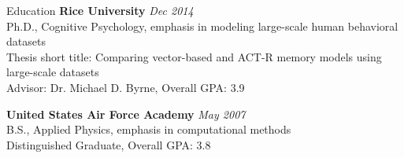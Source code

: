  
\begin{rSection}{Education}
  {\bf Rice University} \hfill {\em Dec 2014} \\
  Ph.D., Cognitive Psychology, emphasis in modeling large-scale human behavioral datasets \\
  Thesis short title: Comparing vector-based and ACT-R memory models using large-scale datasets \\
  Advisor: Dr. Michael D. Byrne, Overall GPA: 3.9
\item {\bf United States Air Force Academy} \hfill {\em May 2007} \\ 
  B.S., Applied Physics, emphasis in computational methods \\
  Distinguished Graduate, Overall GPA: 3.8 
\end{rSection}

